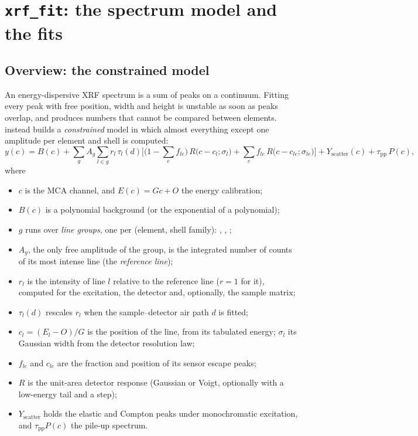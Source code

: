 \section{\texttt{xrf\_fit}: the spectrum model and the fits}\label{sec:fit}

\subsection{Overview: the constrained model}

An energy-dispersive XRF spectrum is a sum of peaks on a continuum. Fitting every peak with
free position, width and height is unstable as soon as peaks overlap, and produces numbers
that cannot be compared between elements.  instead builds a \emph{constrained}
model in which almost everything except one amplitude per element and shell is computed:
\begin{equation}
  y(c) = B(c) + \sum_g A_g \sum_{l\in g} r_l\,\tau_l(d)
  \Big[\big(1-\textstyle\sum_e f_{le}\big)\,R\big(c-c_l;\sigma_l\big)
       + \sum_e f_{le}\,R\big(c-c_{le};\sigma_{le}\big)\Big]
  + Y_\mathrm{scatter}(c) + \tau_\mathrm{pp}\,P(c),
  \label{eq:model}
\end{equation}
where
\begin{itemize}[nosep]
\item $c$ is the MCA channel, and $E(c) = Gc+O$ the energy calibration;
\item $B(c)$ is a polynomial background (or the exponential of a polynomial);
\item $g$ runs over \emph{line groups}, one per (element, shell family): ,
  , ;
\item $A_g$, the only free amplitude of the group, is the integrated number of counts of its
  most intense line (the \emph{reference line});
\item $r_l$ is the intensity of line $l$ relative to the reference line ($r=1$ for it),
  computed for the excitation, the detector and, optionally, the sample matrix;
\item $\tau_l(d)$ rescales $r_l$ when the sample--detector air path $d$ is fitted;
\item $c_l = (E_l-O)/G$ is the position of the line, from its tabulated energy; $\sigma_l$ its
  Gaussian width from the detector resolution law;
\item $f_{le}$ and $c_{le}$ are the fraction and position of its sensor escape peaks;
\item $R$ is the unit-area detector response (Gaussian or Voigt, optionally with a
  low-energy tail and a step);
\item $Y_\mathrm{scatter}$ holds the elastic and Compton peaks under monochromatic
  excitation, and $\tau_\mathrm{pp}P(c)$ the pile-up spectrum.
\end{itemize}
